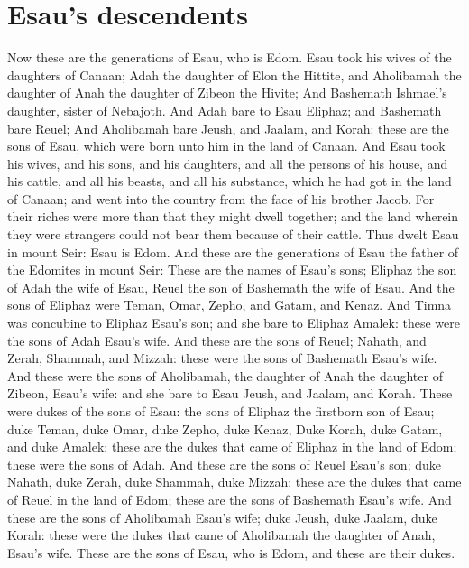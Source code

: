 \section*{Esau's descendents}
\begin{biblechapter} %
\verse Now these are the generations of Esau, who is Edom.
\verse Esau took his wives of the daughters of Canaan; Adah the daughter of Elon the Hittite, and Aholibamah the daughter of Anah the daughter of Zibeon the Hivite;
\verse And Bashemath Ishmael's daughter, sister of Nebajoth.
\verse And Adah bare to Esau Eliphaz; and Bashemath bare Reuel;
\verse And Aholibamah bare Jeush, and Jaalam, and Korah: these are the sons of Esau, which were born unto him in the land of Canaan.
\verse And Esau took his wives, and his sons, and his daughters, and all the persons of his house, and his cattle, and all his beasts, and all his substance, which he had got in the land of Canaan; and went into the country from the face of his brother Jacob.
\verse For their riches were more than that they might dwell together; and the land wherein they were strangers could not bear them because of their cattle.
\verse Thus dwelt Esau in mount Seir: Esau is Edom.
\verse And these are the generations of Esau the father of the Edomites in mount Seir:
\verse These are the names of Esau's sons; Eliphaz the son of Adah the wife of Esau, Reuel the son of Bashemath the wife of Esau.
\verse And the sons of Eliphaz were Teman, Omar, Zepho, and Gatam, and Kenaz.
\verse And Timna was concubine to Eliphaz Esau's son; and she bare to Eliphaz Amalek: these were the sons of Adah Esau's wife.
\verse And these are the sons of Reuel; Nahath, and Zerah, Shammah, and Mizzah: these were the sons of Bashemath Esau's wife.
\verse And these were the sons of Aholibamah, the daughter of Anah the daughter of Zibeon, Esau's wife: and she bare to Esau Jeush, and Jaalam, and Korah.
\verse These were dukes of the sons of Esau: the sons of Eliphaz the firstborn son of Esau; duke Teman, duke Omar, duke Zepho, duke Kenaz,
\verse Duke Korah, duke Gatam, and duke Amalek: these are the dukes that came of Eliphaz in the land of Edom; these were the sons of Adah.
\verse And these are the sons of Reuel Esau's son; duke Nahath, duke Zerah, duke Shammah, duke Mizzah: these are the dukes that came of Reuel in the land of Edom; these are the sons of Bashemath Esau's wife.
\verse And these are the sons of Aholibamah Esau's wife; duke Jeush, duke Jaalam, duke Korah: these were the dukes that came of Aholibamah the daughter of Anah, Esau's wife.
\verse These are the sons of Esau, who is Edom, and these are their dukes.

\end{biblechapter}
